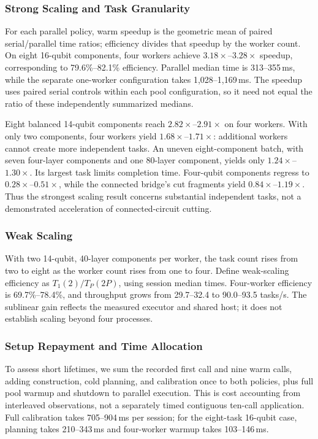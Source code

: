 \subsubsection{Strong Scaling and Task Granularity}
For each parallel policy, warm speedup is the geometric mean of paired serial/parallel time ratios; efficiency divides that speedup by the worker count. On eight 16-qubit components, four workers achieve $3.18\times$--$3.28\times$ speedup, corresponding to 79.6\%--82.1\% efficiency. Parallel median time is 313--355\,ms, while the separate one-worker configuration takes 1,028--1,169\,ms. The speedup uses paired serial controls within each pool configuration, so it need not equal the ratio of these independently summarized medians.

Eight balanced 14-qubit components reach $2.82\times$--$2.91\times$ on four workers. With only two components, four workers yield $1.68\times$--$1.71\times$: additional workers cannot create more independent tasks. An uneven eight-component batch, with seven four-layer components and one 80-layer component, yields only $1.24\times$--$1.30\times$. Its largest task limits completion time. Four-qubit components regress to $0.28\times$--$0.51\times$, while the connected bridge's cut fragments yield $0.84\times$--$1.19\times$. Thus the strongest scaling result concerns substantial independent tasks, not a demonstrated acceleration of connected-circuit cutting.

\subsubsection{Weak Scaling}
With two 14-qubit, 40-layer components per worker, the task count rises from two to eight as the worker count rises from one to four. Define weak-scaling efficiency as $T_1(2)/T_P(2P)$, using session median times. Four-worker efficiency is 69.7\%--78.4\%, and throughput grows from 29.7--32.4 to 90.0--93.5 tasks/s. The sublinear gain reflects the measured executor and shared host; it does not establish scaling beyond four processes.

\subsubsection{Setup Repayment and Time Allocation}
To assess short lifetimes, we sum the recorded first call and nine warm calls, adding construction, cold planning, and calibration once to both policies, plus full pool warmup and shutdown to parallel execution. This is cost accounting from interleaved observations, not a separately timed contiguous ten-call application. Full calibration takes 705--904\,ms per session; for the eight-task 16-qubit case, planning takes 210--343\,ms and four-worker warmup takes 103--146\,ms.

